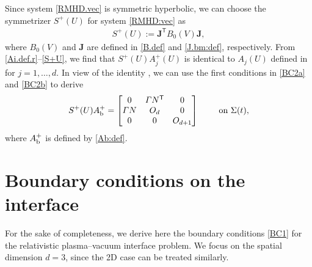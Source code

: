 \documentclass[twoside,11pt]{article}
\numberwithin{equation}{section}
\def\p{\partial}
\begin{document}
Since system \eqref{RMHD.vec} is symmetric hyperbolic, we can choose the symmetrizer $S^+(U)$  for system \eqref{RMHD:vec} as
\begin{align}
	\label{S+U}
	S^+(U):={\bm{J}}^{\mathsf{T}} B_0(V) {\bm{J}},
\end{align}
where $B_0(V)$ and ${\bm{J}}$ are defined in \eqref{B.def} and \eqref{J.bm:def}, respectively.
From \eqref{Ai.def.r}--\eqref{S+U}, we find that $S^+(U)A_{j}^+(U)$ is identical to $A_{j}(U)$ defined in \cite[(5.12)]{TW21MR4201624} for $j=1,\ldots,d$. In view of the identity \cite[(5.13)]{TW21MR4201624},
we can use the first conditions in \eqref{BC2a} and \eqref{BC2b} to derive
\begin{align} %
S^+(U)A_{\rm b}^+
	=\begin{bmatrix}
		0 & \varGamma N^{\mathsf{T}} & 0   \\
		\varGamma N
		&  O_d  &0 \\
		0 & 0 & O_{d+1}
	\end{bmatrix} \qquad
	\textrm{ on } \Sigma(t),	
	\label{iden:App1}
\end{align}
where $A_{\rm b}^+$ is defined by \eqref{Ab:def}.





\vspace*{2mm}
	\section[Boundary conditions on the interface%
	]{Boundary conditions on the interface%
	} \label{app:B}
	

For the sake of completeness, we derive here the boundary conditions \eqref{BC1} for the relativistic plasma--vacuum interface problem. We focus on the spatial dimension $d=3$, since the 2D case can be treated similarly.
\end{document}
